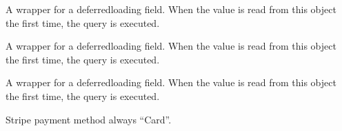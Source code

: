 \documentclass[letterpaper,10pt,english]{sphinxmanual}
\begin{document}
\begin{fulllineitems}

\begin{fulllineitems}
\label{\detokenize{payments:payments.models.StripeTransaction.stripe_exp_month}}
A wrapper for a deferred\sphinxhyphen{}loading field. When the value is read from this
object the first time, the query is executed.

\end{fulllineitems}


\begin{fulllineitems}
\label{\detokenize{payments:payments.models.StripeTransaction.stripe_exp_year}}
A wrapper for a deferred\sphinxhyphen{}loading field. When the value is read from this
object the first time, the query is executed.

\end{fulllineitems}


\begin{fulllineitems}
\label{\detokenize{payments:payments.models.StripeTransaction.stripe_last4}}
A wrapper for a deferred\sphinxhyphen{}loading field. When the value is read from this
object the first time, the query is executed.

\end{fulllineitems}


\begin{fulllineitems}
\label{\detokenize{payments:payments.models.StripeTransaction.stripe_method}}
Stripe payment method \sphinxhyphen{} always “Card”.

\end{fulllineitems}


\end{fulllineitems}
\end{document}
